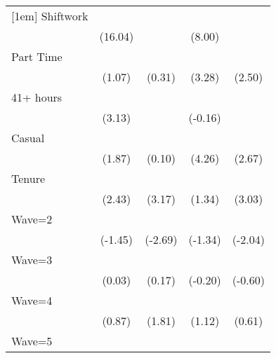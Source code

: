 {\begin{tabular}{l*{4}{c}}
[1em]
Shiftwork           &            \sym{***}&                     &            \sym{***}&                     \\
                    &     (16.04)         &                     &      (8.00)         &                     \\
[1em]
Part Time           &                     &                     &            \sym{**} &            \sym{*}  \\
                    &      (1.07)         &      (0.31)         &      (3.28)         &      (2.50)         \\
[1em]
41+ hours           &            \sym{**} &                     &                     &                     \\
                    &      (3.13)         &                     &     (-0.16)         &                     \\
[1em]
Casual              &                     &                     &            \sym{***}&            \sym{**} \\
                    &      (1.87)         &      (0.10)         &      (4.26)         &      (2.67)         \\
[1em]
Tenure              &            \sym{*}  &            \sym{**} &                     &            \sym{**} \\
                    &      (2.43)         &      (3.17)         &      (1.34)         &      (3.03)         \\
[1em]
Wave=2              &                     &            \sym{**} &                     &            \sym{*}  \\
                    &     (-1.45)         &     (-2.69)         &     (-1.34)         &     (-2.04)         \\
[1em]
Wave=3              &                     &                     &                     &                     \\
                    &      (0.03)         &      (0.17)         &     (-0.20)         &     (-0.60)         \\
[1em]
Wave=4              &                     &                     &                     &                     \\
                    &      (0.87)         &      (1.81)         &      (1.12)         &      (0.61)         \\
[1em]
Wave=5              &                     &                     &            \sym{**} &                     \\

\end{tabular}}
